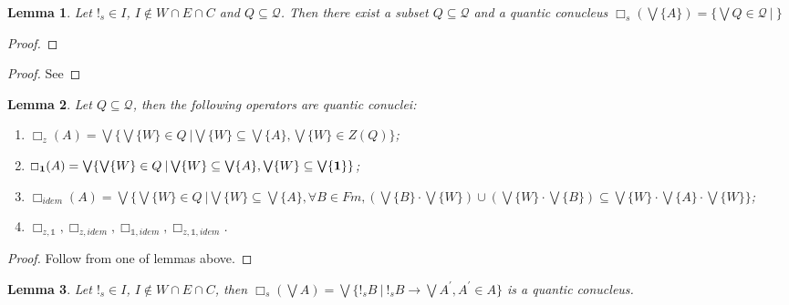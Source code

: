 \documentclass[a4paper]{article}
\newtheorem{lemma}{Lemma}
\begin{document}
\begin{lemma}
  Let $!_s \in I$, $I \notin W \cap E \cap C$ and $Q \subseteq \mathcal{Q}$.
  Then there exist a subset $Q \subseteq \mathcal{Q}$ and
  a quantic conucleus $\Box_s (\bigvee \{ A \}) = \{ \bigvee Q \in \mathcal{Q} \: | \: \}$
\end{lemma}

\begin{proof}
\end{proof}

\begin{proof}
  See
\end{proof}

\begin{lemma} Let $Q \subseteq \mathcal{Q}$, then the following operators are quantic conuclei:
  \begin{enumerate}
    \item $\Box_z (A) = \bigvee \{ \bigvee \{ W \} \in Q \: | \bigvee \{ W \} \subseteq \bigvee \{ A \}, \bigvee \{ W \} \in Z(Q) \}$;
    \item $\Box_{{\bf 1}} (A) = \bigvee \{ \bigvee \{ W \} \in Q \: | \bigvee \{ W \} \subseteq \bigvee \{ A \}, \bigvee \{ W \} \subseteq \bigvee \{ {\bf 1} \} \}$;
    \item $\Box_{idem} (A) = \bigvee \{ \bigvee \{ W \} \in Q \: | \bigvee \{ W \} \subseteq \bigvee \{ A \}, \forall B \in Fm, (\bigvee \{ B \} \cdot \bigvee \{ W \}) \cup (\bigvee \{ W \} \cdot \bigvee \{ B \}) \subseteq \bigvee \{ W \} \cdot \bigvee \{ A \} \cdot \bigvee \{ W \} \}$;
    \item $\Box_{z, \mathds{1}}, \Box_{z, idem}, \Box_{\mathds{1}, idem}, \Box_{z, \mathds{1}, idem}$.
  \end{enumerate}
\end{lemma}

\begin{proof}
  Follow from one of lemmas above.
\end{proof}

\begin{lemma}
  Let $!_s \in I$, $I \notin W \cap E \cap C$,
  then $\Box_s (\bigvee A) = \bigvee \{ !_s B \: | \: !_s B \rightarrow \bigvee A^{'}, A^{'} \in A \}$
  is a quantic conucleus.
\end{lemma}
\end{document}
